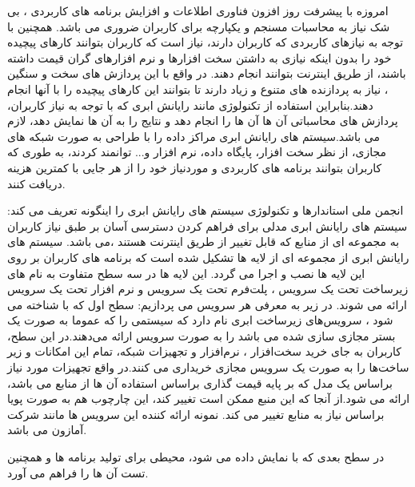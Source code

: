  امروزه با پیشرفت روز افزون فناوری اطلاعات و افزایش برنامه های کاربردی ، 
 بی شک نیاز به محاسبات مسنجم و یکپارچه برای کاربران ضروری می باشد.
 همچنین با توجه به نیازهای کاربردی که کاربران دارند، 
 نیاز است که کاربران بتوانند کارهای پیچیده خود را بدون  اینکه 
 نیازی به داشتن سخت افزارها و نرم افزارهای گران قیمت داشته باشند، 
 از طریق اینترنت بتوانند انجام دهند. در واقع با این پردازش های سخت و سنگین ، 
 نیاز به پردازنده های متنوع و زیاد دارند تا بتوانند این کارهای پیچیده را با آنها انجام دهند.بنابراین استفاده از تکنولوژی مانند رایانش ابری که با توجه به نیاز کاربران، پردازش های محاسباتی آن ها آن ها را انجام دهد و نتایج را به آن ها 
 نمایش دهد، لازم می باشد.سیستم های رایانش ابری مراکز داده را با طراحی به صورت شبکه های مجازی، از نظر سخت افزار، پایگاه داده، نرم افزار و... توانمند کردند، 
 به طوری که کاربران بتوانند برنامه های کاربردی و موردنیاز خود را از هر جایی  با کمترین هزینه دریافت کنند.
  \cite{define,num2}
  
  انجمن ملی استاندارها و تکنولوژی سیستم های رایانش ابری را اینگونه تعریف می کند: سیستم های رایانش ابری مدلی برای فراهم کردن دسترسی آسان بر طبق نیاز کاربران به مجموعه ای از منابع که قابل تغییر از طریق اینترنت هستند ،می باشد.
  \cite{define}
   سیستم های رایانش ابری از مجموعه ای از لایه ها تشکیل شده است که برنامه های کاربران بر روی این لایه ها نصب و اجرا می گردد. این لایه ها در سه سطح متفاوت به نام های زیرساخت تحت یک سرویس
    ، پلت‌فرم تحت یک سرویس
     و نرم ‌افزار تحت یک سرویس
     ارائه می شوند. در زیر به معرفی هر سرویس می پردازیم:
 سطح اول که با 
 شناخته می شود ، سرویس‌های زیرساخت ابری نام دارد که سیستمی را که عموما به صورت یک بستر مجازی سازی شده می باشد را به صورت سرویس ارائه می‌دهند.در این سطح، کاربران به جای خرید سخت‌افزار ، نرم‌افزار و تجهیزات شبکه، تمام این امکانات و زیر ساخت‌ها را به صورت یک سرویس مجازی خریداری می کنند.در واقع تجهیزات مورد نیاز براساس یک مدل که بر پایه قیمت گذاری براساس استفاده آن ها از منابع می باشد، ارائه می شود.از آنجا که این منبع ممکن است تغییر کند، این چارچوب هم به صورت پویا براساس نیاز به منابع تغییر می کند. نمونه ارائه کننده این سرویس ها مانند شرکت آمازون می باشد.
   
 در سطح بعدی که با 
  نمایش داده می شود، محیطی برای تولید برنامه ها و همچنین تست آن ها  را فراهم می آورد. 
  
